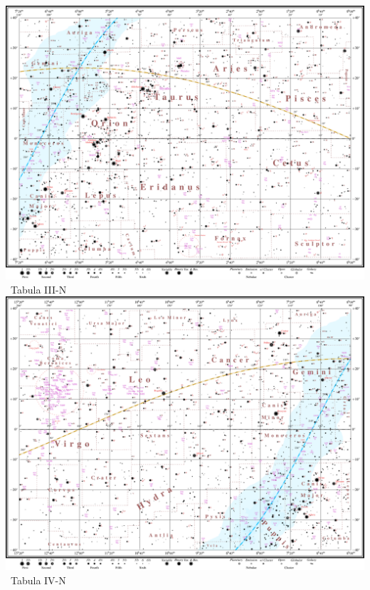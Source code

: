 \documentclass[10pt,landscape,oneside]{article}
\begin{document}
\begin{center}
\clearpage
%
\noindent\includegraphics[height=0.963\textheight]{TabulaIII.pdf}\\[-0.985\textheight]\hfill\large~Tabula III-N\hspace{25mm}
\clearpage
%
\noindent\includegraphics[height=0.963\textheight]{TabulaIV.pdf}\\[-0.985\textheight]\hfill\large~Tabula IV-N\hspace{25mm}
\clearpage
%

\end{center}
\end{document}

